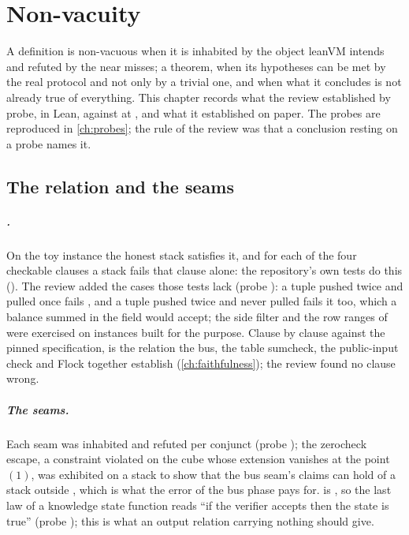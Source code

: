 \chapter{Non-vacuity}\label{ch:nonvacuity}

A definition is non-vacuous when it is inhabited by the object leanVM intends and refuted by
the near misses; a theorem, when its hypotheses can be met by the real protocol and not only by
a trivial one, and when what it concludes is not already true of everything. This chapter
records what the review established by probe, in Lean, against  at ,
and what it established on paper. The probes are reproduced in \cref{ch:probes}; the rule of the
review was that a conclusion resting on a probe names it.

\section{The relation and the seams}\label{sec:nv-relation}

\paragraph{.} On the toy instance the honest stack satisfies it, and for each of
the four checkable clauses a stack fails that clause alone: the repository's own tests do this
(). The review added the cases those tests lack
(probe ): a tuple pushed twice and pulled once fails , and a
tuple pushed twice and never pulled fails it too, which a balance summed in the field would
accept; the side filter and the row ranges of  were exercised on instances built
for the purpose. Clause by clause against the pinned specification,  is the
relation the bus, the table sumcheck, the public-input check and Flock together establish
(\cref{ch:faithfulness}); the review found no clause wrong.

\paragraph{The seams.} Each seam was inhabited and refuted per conjunct (probe );
the zerocheck escape, a constraint violated on the cube whose extension vanishes at the point
$(1)$, was exhibited on a stack  to show that the bus seam's claims can hold
of a stack outside , which is what the error of the bus phase pays for.
 is , so the last law of a knowledge state function reads
\enquote{if the verifier accepts then the state is true} (probe ); this is
what an output relation carrying nothing should give.

